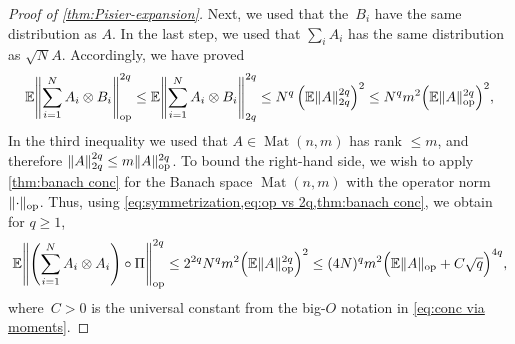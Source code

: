 \documentclass[aos]{imsart}
\theoremstyle{definition}
\numberwithin{equation}{section}
\DeclareMathOperator{\op}{op}
\DeclareMathOperator{\Mat}{Mat}
\DeclarePairedDelimiter{\norm}{\lVert}{\rVert}
\newcommand{\ot}{\otimes}
\newcommand{\E}{\mathbb{E}}
\begin{document}
\begin{appendix}
\begin{proof} [Proof of \cref{thm:Pisier-expansion}]
Next, we used that the~$B_i$ have the same distribution as $A$.
In the last step, we used that $\sum_i A_i$ has the same distribution as $\sqrt N A$.
Accordingly, we have proved
\begin{align}\label{eq:op vs 2q}
\E \norm*{\sum_{i=1}^N A_i \ot B_i}_{\op}^{2q}
\leq \E \norm*{\sum_{i=1}^N A_i \ot B_i}_{2q}^{2q}
\leq N^q \left( \E\norm{A}_{2q}^{2q} \right)^2
\leq N^q m^2 \Bigl( \E\norm{A}_{\op}^{2q} \Bigr)^2,
\end{align}
In the third inequality we used that $A \in \Mat(n,m)$ has rank $\leq m$, and therefore $\norm{A}_{2q}^{2q} \leq m \norm A_{\op}^{2q}$.
To bound the right-hand side, we wish to apply \cref{thm:banach conc} for the Banach space $\Mat(n,m)$ with the operator norm~$\norm{\cdot}_{\op}$.
Thus, using \cref{eq:symmetrization,eq:op vs 2q,thm:banach conc}, we obtain for $q\geq1$,
\begin{align*}
\E \norm*{\left( \sum_{i=1}^N A_i \otimes A_i \right) \circ \Pi}_{\op}^{2q}
\leq 2^{2q} N^q m^2 \Bigl( \E\norm{A}_{\op}^{2q} \Bigr)^2
\leq (4 N)^q m^2 \Bigl( \E\norm A_{\op} + C \sqrt{q} \Bigr)^{4q},
\end{align*}
where~$C>0$ is the universal constant from the big-$O$ notation in \cref{eq:conc via moments}.


\end{proof}
\end{appendix}
\end{document}
